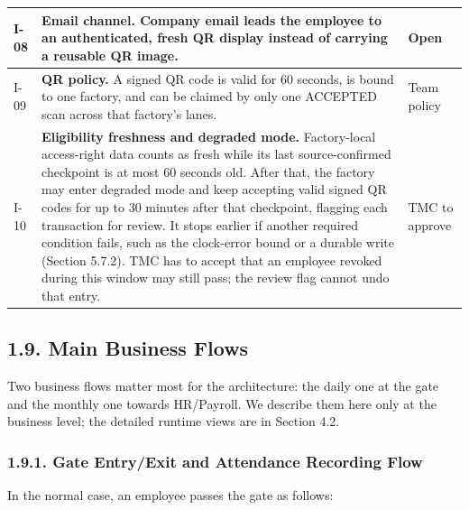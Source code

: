 {\begin{longtable}{|>{\raggedright\arraybackslash}p{28pt}|>{\raggedright\arraybackslash}p{325pt}|>{\raggedright\arraybackslash}p{64pt}|}
\hline
I-08 & \textbf{Email channel.} Company email leads the employee to an authenticated, fresh QR display instead of carrying a reusable QR image. & Open \\
\hline
I-09 & \textbf{QR policy.} A signed QR code is valid for 60 seconds, is bound to one factory, and can be claimed by only one ACCEPTED scan across that factory's lanes. & Team policy \\*
\hline\noalign{\nobreak}
I-10 & \textbf{Eligibility freshness and degraded mode.} Factory-local access-right data counts as fresh while its last source-confirmed checkpoint is at most 60 seconds old. After that, the factory may enter degraded mode and keep accepting valid signed QR codes for up to 30 minutes after that checkpoint, flagging each transaction for review. It stops earlier if another required condition fails, such as the clock-error bound or a durable write (Section 5.7.2). TMC has to accept that an employee revoked during this window may still pass; the review flag cannot undo that entry. & TMC to approve \\
\hline
\end{longtable}
}


\subsection*{1.9. Main Business Flows}

{}

Two business flows matter most for the architecture: the daily one at the gate and the monthly one towards HR/Payroll. We describe them here only at the business level; the detailed runtime views are in Section 4.2.

\subsubsection*{1.9.1. Gate Entry/Exit and Attendance Recording Flow}

{}

In the normal case, an employee passes the gate as follows:

